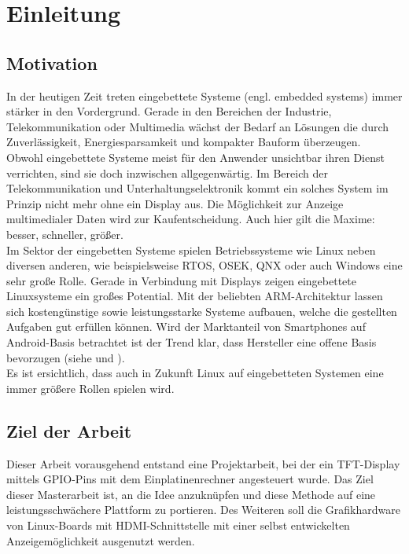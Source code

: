 
\chapter{Einleitung}
\label{cha:Einleitung}

\section{Motivation}
In der heutigen Zeit treten eingebettete Systeme (engl. embedded systems) immer stärker in den Vordergrund. Gerade in den Bereichen der Industrie, Telekommunikation oder Multimedia wächst der Bedarf an Lösungen die durch Zuverlässigkeit, Energiesparsamkeit und kompakter Bauform überzeugen.\\
Obwohl eingebettete Systeme meist für den Anwender unsichtbar ihren Dienst verrichten, sind sie doch inzwischen allgegenwärtig. Im Bereich der Telekommunikation und Unterhaltungselektronik kommt ein solches System im Prinzip nicht mehr ohne ein Display aus. Die Möglichkeit zur Anzeige multimedialer Daten wird zur Kaufentscheidung. Auch hier gilt die Maxime: besser, schneller, größer.\\
Im Sektor der eingebetten Systeme spielen Betriebssysteme wie Linux neben diversen anderen, wie beispielsweise RTOS, OSEK, QNX oder auch Windows eine sehr große Rolle. Gerade in Verbindung mit Displays zeigen eingebettete Linuxsysteme ein großes Potential. Mit der beliebten ARM-Architektur lassen sich kostengünstige sowie leistungsstarke Systeme aufbauen, welche die gestellten Aufgaben gut erfüllen können. Wird der Marktanteil von Smartphones auf Android-Basis betrachtet ist der Trend klar, dass Hersteller eine offene Basis bevorzugen (siehe \cite{android2014} und \cite{Brandt2013}).\\
Es ist ersichtlich, dass auch in Zukunft Linux auf eingebetteten Systemen eine immer größere Rollen spielen wird. 

\section{Ziel der Arbeit}
Dieser Arbeit vorausgehend entstand eine Projektarbeit, bei der ein TFT-Display mittels GPIO-Pins mit dem Einplatinenrechner  angesteuert wurde. Das Ziel dieser Masterarbeit ist, an die Idee anzuknüpfen und diese Methode auf eine leistungsschwächere Plattform zu portieren. Des Weiteren soll die Grafikhardware von Linux-Boards mit HDMI-Schnittstelle mit einer selbst entwickelten Anzeigemöglichkeit ausgenutzt werden.

